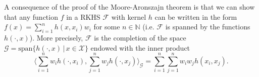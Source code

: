 A consequence of the proof of the Moore-Aronszajn theorem \citep[see][]{Hein2004} is that we can  show that any function $f$ in a RKHS $\mathcal F$ with kernel $h$ can be written in the form $f(x)=\sum_{i=1}^n h(x, x_i)w_i$ for some $n \in \mathbb N$ (i.e. $\mathcal F$ is spanned by the functions $h(\cdot,x)$). More precisely, $\mathcal F$ is the completion of the space $\mathcal G = \text{span}\{h(\cdot,x) \, | \, x \in \mathcal X \}$ endowed with the inner product
\[
	\Bigg\langle \sum_{i=1}^n w_i h(\cdot, x_i), \sum_{j=1}^n w_j h(\cdot, x_j) \Bigg\rangle_{\mathcal G} = \sum_{i=1}^n\sum_{j=1}^n w_iw_jh(x_i,x_j).
\]































































